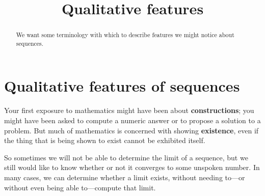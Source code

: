 \documentclass{ximera}
\title{Qualitative features}
\newcommand{\defnword}[1]{\textbf{#1}}
\begin{document}
\begin{abstract}
  We want some terminology with which to describe features we might
  notice about sequences.
\end{abstract}

\maketitle

\section{Qualitative features of sequences}
\label{section:qualitative-features-of-sequences}

Your first exposure to mathematics might have been about
\defnword{constructions}; you might have been asked to compute a
numeric answer or to propose a solution to a problem.  But much of
mathematics is concerned with showing \defnword{existence}, even if
the thing that is being shown to exist cannot be exhibited itself.

So sometimes we will not be able to determine the limit of a sequence,
but we still would like to know whether or not it converges to some
unspoken number.  In many cases, we can determine whether a limit
exists, without needing to---or without even being able to---compute
that limit.
\end{document}
